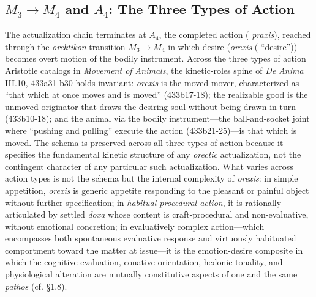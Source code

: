 \subsection{$M_3 \rightarrow M_4$ and $A_4$: The Three Types of Action}

The actualization chain terminates at $A_4$, the completed action ( \textit{praxis}), reached through the \textit{orektikon} transition $M_3 \rightarrow M_4$ in which desire (\textit{orexis} ( ``desire'')) becomes overt motion of the bodily instrument. Across the three types of action Aristotle catalogs in \textit{Movement of Animals}, the kinetic-roles spine of \textit{De Anima} III.10, 433a31-b30 holds invariant: \textit{orexis} is the moved mover, characterized as ``that which at once moves and is moved'' (433b17-18); the realizable good is the unmoved originator that draws the desiring soul without being drawn in turn (433b10-18); and the animal via the bodily instrument---the ball-and-socket joint where ``pushing and pulling'' execute the action (433b21-25)---is that which is moved. The schema is preserved across all three types of action because it specifies the fundamental kinetic structure of any \textit{orectic} actualization, not the contingent character of any particular such actualization. What varies across action types is not the schema but the internal complexity of \textit{orexis}: in simple appetition, \textit{orexis} is generic appetite responding to the pleasant or painful object without further specification; in \textit{habitual-procedural action}, it is rationally articulated by settled \textit{doxa} whose content is craft-procedural and non-evaluative, without emotional concretion; in evaluatively complex action---which encompasses both spontaneous evaluative response and virtuously habituated comportment toward the matter at issue---it is the emotion-desire composite in which the cognitive evaluation, conative orientation, hedonic tonality, and physiological alteration are mutually constitutive aspects of one and the same \textit{pathos} (cf. \S 1.8).

